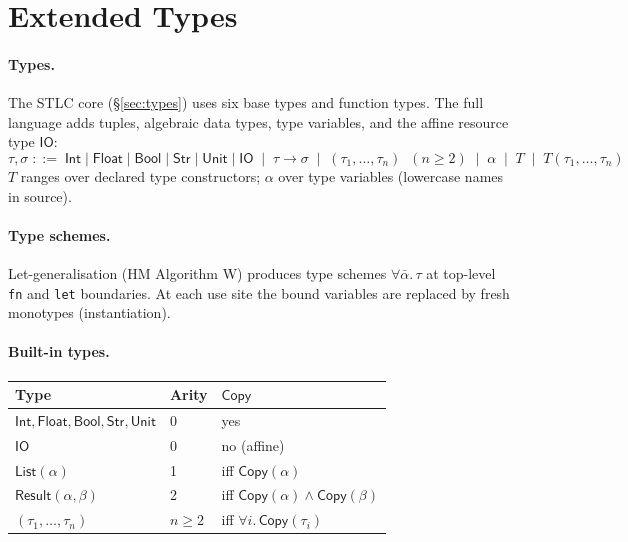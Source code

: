 \documentclass[10pt,a4paper]{article}
\newcommand{\TInt}{\mathsf{Int}}
\newcommand{\TFlt}{\mathsf{Float}}
\newcommand{\TBool}{\mathsf{Bool}}
\newcommand{\TStr}{\mathsf{Str}}
\newcommand{\TUnit}{\mathsf{Unit}}
\newcommand{\TIO}{\mathsf{IO}}
\newcommand{\TCopy}{\mathsf{Copy}}
\theoremstyle{plain}
\theoremstyle{definition}
\theoremstyle{remark}
\begin{document}
\section{Extended Types}
\label{sec:types-ext}

\paragraph{Types.}
The STLC core (\S\ref{sec:types}) uses six base types and function types.
The full language adds tuples, algebraic data types, type variables, and the
affine resource type $\TIO$:
\[
\tau,\sigma \;::=\;
  \TInt \mid \TFlt \mid \TBool \mid \TStr \mid \TUnit \mid \TIO
  \;\mid\; \tau\to\sigma
  \;\mid\; (\tau_1,\ldots,\tau_n)\;\;(n\ge 2)
  \;\mid\; \alpha
  \;\mid\; T \;\mid\; T(\tau_1,\ldots,\tau_n)
\]
$T$ ranges over declared type constructors; $\alpha$ over type variables
(lowercase names in source).

\paragraph{Type schemes.}
Let-generalisation (HM Algorithm W) produces type schemes
$\forall\bar\alpha.\,\tau$ at top-level \texttt{fn} and \texttt{let}
boundaries.  At each use site the bound variables are replaced by fresh
monotypes (instantiation).

\paragraph{Built-in types.}
\begin{center}
\renewcommand{\arraystretch}{1.2}
\begin{tabular}{@{}lll@{}}
\toprule
Type & Arity & $\TCopy$ \\
\midrule
$\TInt,\TFlt,\TBool,\TStr,\TUnit$       & 0 & yes \\
$\TIO$                                   & 0 & no (affine) \\
$\mathsf{List}(\alpha)$                  & 1 & iff $\TCopy(\alpha)$ \\
$\mathsf{Result}(\alpha,\beta)$          & 2 & iff $\TCopy(\alpha)\wedge\TCopy(\beta)$ \\
$(\tau_1,\ldots,\tau_n)$                 & $n\ge 2$ & iff $\forall i.\,\TCopy(\tau_i)$ \\
\bottomrule
\end{tabular}
\end{center}
\end{document}

